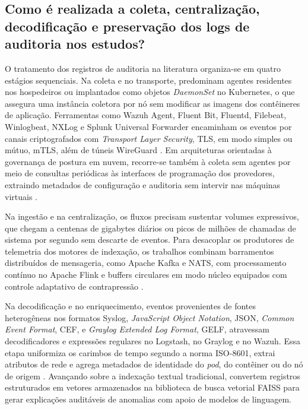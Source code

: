 \subsection{Como é realizada a coleta, centralização, decodificação e preservação dos logs de auditoria nos estudos?}
\label{subsec:rsl_qs04}

O tratamento dos registros de auditoria na literatura organiza-se em quatro estágios sequenciais. Na coleta e no transporte, predominam agentes residentes nos hospedeiros ou implantados como objetos \textit{DaemonSet} no Kubernetes, o que assegura uma instância coletora por nó sem modificar as imagens dos contêineres de aplicação. Ferramentas como Wazuh Agent, Fluent Bit, Fluentd, Filebeat, Winlogbeat, NXLog e Splunk Universal Forwarder encaminham os eventos por canais criptografados com \textit{Transport Layer Security}, TLS, em modo simples ou mútuo, mTLS, além de túneis WireGuard \cite{bungei2026,sushma2025,aftab2026,kalafatidis2025,coutinho2023}. Em arquiteturas orientadas à governança de postura em nuvem, recorre-se também à coleta sem agentes por meio de consultas periódicas às interfaces de programação dos provedores, extraindo metadados de configuração e auditoria sem intervir nas máquinas virtuais \cite{torkura2021,joshisabhaya2026}.

Na ingestão e na centralização, os fluxos precisam sustentar volumes expressivos, que chegam a centenas de gigabytes diários ou picos de milhões de chamadas de sistema por segundo sem descarte de eventos. Para desacoplar os produtores de telemetria dos motores de indexação, os trabalhos combinam barramentos distribuídos de mensageria, como Apache Kafka e NATS, com processamento contínuo no Apache Flink e buffers circulares em modo núcleo equipados com controle adaptativo de contrapressão \cite{aftab2026,shao2026a,joshisegireddy2026}.

Na decodificação e no enriquecimento, eventos provenientes de fontes heterogêneas nos formatos Syslog, \textit{JavaScript Object Notation}, JSON, \textit{Common Event Format}, CEF, e \textit{Graylog Extended Log Format}, GELF, atravessam decodificadores e expressões regulares no Logstash, no Graylog e no Wazuh. Essa etapa uniformiza os carimbos de tempo segundo a norma ISO-8601, extrai atributos de rede e agrega metadados de identidade do \textit{pod}, do contêiner ou do nó de origem \cite{sushma2025,jin2025,albuquerque2024}. Avançando sobre a indexação textual tradicional,  convertem registros estruturados em vetores armazenados na biblioteca de busca vetorial FAISS para gerar explicações auditáveis de anomalias com apoio de modelos de linguagem.

